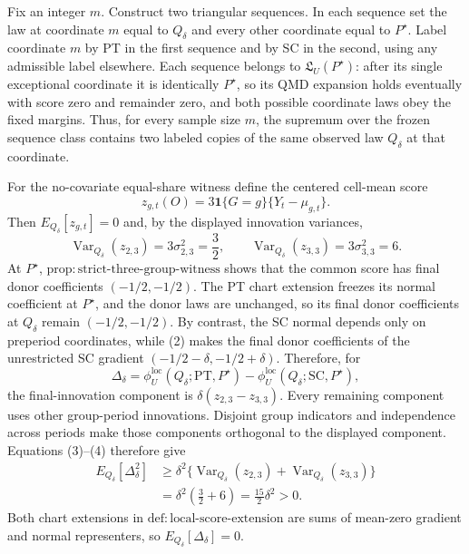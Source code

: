 Fix an integer \(m\). Construct two triangular sequences. In each sequence set the law at coordinate \(m\) equal to \(Q_\delta\) and every other coordinate equal to \(P^{\star}\). Label coordinate \(m\) by PT in the first sequence and by SC in the second, using any admissible label elsewhere. Each sequence belongs to \(\mathfrak L_U(P^{\star})\): after its single exceptional coordinate it is identically \(P^{\star}\), so its QMD expansion holds eventually with score zero and remainder zero, and both possible coordinate laws obey the fixed margins. Thus, for every sample size \(m\), the supremum over the frozen sequence class contains two labeled copies of the same observed law \(Q_\delta\) at that coordinate.

For the no-covariate equal-share witness define the centered cell-mean score
\[
 z_{g,t}(O)=3\mathbf 1\{G=g\}\{Y_t-\mu_{g,t}\}.
 \tag{3}
\]
Then \(E_{Q_\delta}[z_{g,t}]=0\) and, by the displayed innovation variances,
\[
 \operatorname{Var}_{Q_\delta}(z_{2,3})=3\sigma_{2,3}^2=\frac32,
 \qquad
 \operatorname{Var}_{Q_\delta}(z_{3,3})=3\sigma_{3,3}^2=6.
 \tag{4}
\]
At \(P^{\star}\), \(\mathrm{prop{:}strict\text{-}three\text{-}group\text{-}witness}\) shows that the common score has final donor coefficients \((-1/2,-1/2)\). The PT chart extension freezes its normal coefficient at \(P^{\star}\), and the donor laws are unchanged, so its final donor coefficients at \(Q_\delta\) remain \((-1/2,-1/2)\). By contrast, the SC normal depends only on preperiod coordinates, while (2) makes the final donor coefficients of the unrestricted SC gradient \((-1/2-\delta,-1/2+\delta)\). Therefore, for
\[
 \Delta_\delta
 =\phi_U^{\mathrm{loc}}(Q_\delta;\mathrm{PT},P^{\star})
  -\phi_U^{\mathrm{loc}}(Q_\delta;\mathrm{SC},P^{\star}),
 \tag{5}
\]
the final-innovation component is \(\delta(z_{2,3}-z_{3,3})\). Every remaining component uses other group-period innovations. Disjoint group indicators and independence across periods make those components orthogonal to the displayed component. Equations (3)--(4) therefore give
\[
 \begin{aligned}
 E_{Q_\delta}[\Delta_\delta^2]
 &\ge\delta^2\{\operatorname{Var}_{Q_\delta}(z_{2,3})
                 +\operatorname{Var}_{Q_\delta}(z_{3,3})\}\\
 &=\delta^2\left(\frac32+6\right)
 =\frac{15}{2}\delta^2>0.
 \end{aligned}
 \tag{6}
\]
Both chart extensions in \(\mathrm{def{:}local\text{-}score\text{-}extension}\) are sums of mean-zero gradient and normal representers, so \(E_{Q_\delta}[\Delta_\delta]=0\).

